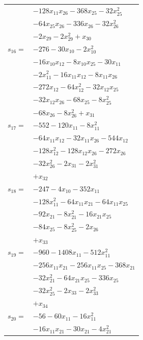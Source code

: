 \begin{longtable}{@{}r@{\;}l@{}}
 & \(\displaystyle -128x_{11}x_{26} -368x_{25} -32x_{25}^{2}\) \\
 & \(\displaystyle -64x_{25}x_{26} -336x_{26} -32x_{26}^{2}\) \\
 & \(\displaystyle -2x_{29} -2x_{29}^{2} +x_{30}\) \\[3pt]
\(s_{16}=\) & \(\displaystyle -276 -30x_{10} -2x_{10}^{2}\) \\
 & \(\displaystyle -16x_{10}x_{12} -8x_{10}x_{25} -30x_{11}\) \\
 & \(\displaystyle -2x_{11}^{2} -16x_{11}x_{12} -8x_{11}x_{26}\) \\
 & \(\displaystyle -272x_{12} -64x_{12}^{2} -32x_{12}x_{25}\) \\
 & \(\displaystyle -32x_{12}x_{26} -68x_{25} -8x_{25}^{2}\) \\
 & \(\displaystyle -68x_{26} -8x_{26}^{2} +x_{31}\) \\[3pt]
\(s_{17}=\) & \(\displaystyle -552 -120x_{11} -8x_{11}^{2}\) \\
 & \(\displaystyle -64x_{11}x_{12} -32x_{11}x_{26} -544x_{12}\) \\
 & \(\displaystyle -128x_{12}^{2} -128x_{12}x_{26} -272x_{26}\) \\
 & \(\displaystyle -32x_{26}^{2} -2x_{31} -2x_{31}^{2}\) \\
 & \(\displaystyle +x_{32}\) \\[3pt]
\(s_{18}=\) & \(\displaystyle -247 -4x_{10} -352x_{11}\) \\
 & \(\displaystyle -128x_{11}^{2} -64x_{11}x_{21} -64x_{11}x_{25}\) \\
 & \(\displaystyle -92x_{21} -8x_{21}^{2} -16x_{21}x_{25}\) \\
 & \(\displaystyle -84x_{25} -8x_{25}^{2} -2x_{26}\) \\
 & \(\displaystyle +x_{33}\) \\[3pt]
\(s_{19}=\) & \(\displaystyle -960 -1408x_{11} -512x_{11}^{2}\) \\
 & \(\displaystyle -256x_{11}x_{21} -256x_{11}x_{25} -368x_{21}\) \\
 & \(\displaystyle -32x_{21}^{2} -64x_{21}x_{25} -336x_{25}\) \\
 & \(\displaystyle -32x_{25}^{2} -2x_{33} -2x_{33}^{2}\) \\
 & \(\displaystyle +x_{34}\) \\[3pt]
\(s_{20}=\) & \(\displaystyle -56 -60x_{11} -16x_{11}^{2}\) \\
 & \(\displaystyle -16x_{11}x_{21} -30x_{21} -4x_{21}^{2}\) \\

\end{longtable}
